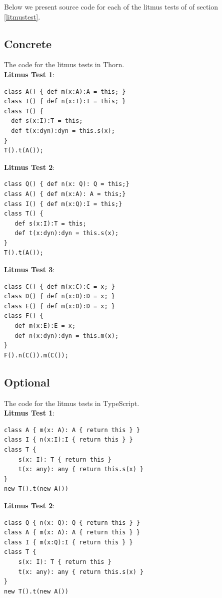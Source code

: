 \documentclass[a4paper,USenglish]{tex/lipics-v2016}
\begin{document}
Below we present source code for each of the litmus tests of 
of section \ref{litmustest}. 

\subsection*{Concrete}

The code for the litmus tests in Thorn. \\ 

\noindent
\textbf{Litmus Test 1}:
\begin{verbatim}
class A() { def m(x:A):A = this; }
class I() { def n(x:I):I = this; }
class T() {
  def s(x:I):T = this;
  def t(x:dyn):dyn = this.s(x);
}
T().t(A());
\end{verbatim}

\noindent
\textbf{Litmus Test 2}:
\begin{verbatim}
class Q() { def n(x: Q): Q = this;}
class A() { def m(x:A): A = this;}
class I() { def m(x:Q):I = this;}
class T() {
   def s(x:I):T = this; 
   def t(x:dyn):dyn = this.s(x);
}
T().t(A());   
\end{verbatim}


\noindent\textbf{Litmus Test 3}:
\begin{verbatim}
class C() { def m(x:C):C = x; }
class D() { def n(x:D):D = x; }
class E() { def m(x:D):D = x; }      
class F() {
   def m(x:E):E = x;
   def n(x:dyn):dyn = this.m(x);
} 
F().n(C()).m(C());
\end{verbatim}

\subsection*{Optional}

The code for the litmus tests in TypeScript. \\

\noindent\textbf{Litmus Test 1}:
\begin{verbatim}
class A { m(x: A): A { return this } }
class I { n(x:I):I { return this } }
class T {
    s(x: I): T { return this }
    t(x: any): any { return this.s(x) }
}
new T().t(new A())
\end{verbatim}

\noindent\textbf{Litmus Test 2}:
\begin{verbatim}
class Q { n(x: Q): Q { return this } }
class A { m(x: A): A { return this } }
class I { m(x:Q):I { return this } }
class T {
    s(x: I): T { return this }
    t(x: any): any { return this.s(x) }
}
new T().t(new A())
\end{verbatim}
\end{document}
